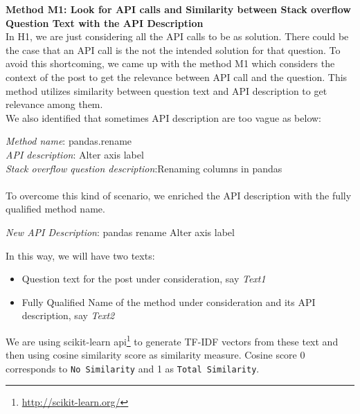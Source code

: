 \textbf{Method M1: Look for API calls and Similarity between Stack overflow Question Text with the API Description}\\

In H1, we are just considering all the API calls to be as solution. There could be the case that an API call is the not the intended solution for that question. To avoid this shortcoming, we came up with the method M1 which considers the context of the post to get the relevance between API call and the question. This method utilizes similarity between question text and API description to get relevance among them.\\
We also identified that sometimes API description are too vague as below:

\textit{Method name}: pandas.rename\\
\textit{API description}: Alter axis label\\
\textit{Stack overflow question description}:Renaming columns in pandas\\\\
To overcome this kind of scenario, we enriched the API description with the fully qualified method name.

\textit{New API Description}: pandas rename Alter axis label

In this way, we will have two texts:
\begin{itemize}
	\item Question text for the post under consideration, say \textit{Text1}
	\item Fully Qualified Name of the method under consideration and its API description, say \textit{Text2}
\end{itemize}

We are using scikit-learn api\footnote{\url{http://scikit-learn.org/}} to generate TF-IDF vectors from these text and then using cosine similarity score as similarity measure. Cosine score 0 corresponds to \texttt{No Similarity} and 1 as \texttt{Total Similarity}.